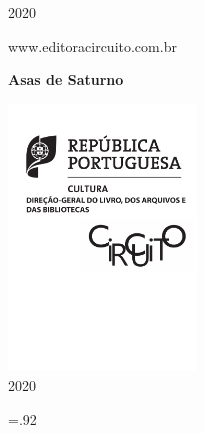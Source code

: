 {\begin{Parskip}
\vspace*{\fill}

2020

www.editoracircuito.com.br
\end{Parskip}

\pagebreak
\begin{flushright}
 
\vspace*{5cm}

\huge{\textbf{Asas de Saturno}} \hspace*{1.25cm}

\LARGE{} \hspace*{.68cm}


\vfill
\hfill\includegraphics[width=5cm]{logos.pdf}\\ \normalsize{2020}
\par\end{flushright}\clearpage
\begingroup \footnotesize \parindent0pt \parskip 5pt \thispagestyle{empty} \vspace*{.25\textheight}\mbox{} \vfill
\baselineskip=.92\baselineskip
{}
\thispagestyle{empty} \endgroup
\ifdefvoid{\sobreautor}{}{\pagebreak\ifodd\thepage\paginabranca\fi}

}
